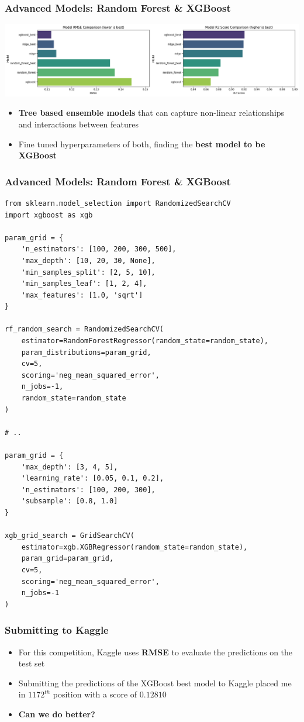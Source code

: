 \documentclass{beamer}
\begin{document}
\begin{frame}
\frametitle{Advanced Models: Random Forest \& XGBoost}
\centering
    \includegraphics[width=1\textwidth]{../challenge/main_files/main_73_0.png}

\begin{itemize}
    \item \textbf{Tree based ensemble models} that can capture non-linear relationships and interactions between features
    \item Fine tuned hyperparameters of both, finding the \textbf{best model to be XGBoost}
\end{itemize}
\end{frame}

\begin{frame}[fragile]
\frametitle{Advanced Models: Random Forest \& XGBoost}

\begin{verbatim}
from sklearn.model_selection import RandomizedSearchCV
import xgboost as xgb

param_grid = {
    'n_estimators': [100, 200, 300, 500],
    'max_depth': [10, 20, 30, None],
    'min_samples_split': [2, 5, 10],
    'min_samples_leaf': [1, 2, 4],
    'max_features': [1.0, 'sqrt']
}

rf_random_search = RandomizedSearchCV(
    estimator=RandomForestRegressor(random_state=random_state),
    param_distributions=param_grid,
    cv=5,
    scoring='neg_mean_squared_error',
    n_jobs=-1,
    random_state=random_state
)

# ..

param_grid = {
    'max_depth': [3, 4, 5],
    'learning_rate': [0.05, 0.1, 0.2],
    'n_estimators': [100, 200, 300],
    'subsample': [0.8, 1.0]
}

xgb_grid_search = GridSearchCV(
    estimator=xgb.XGBRegressor(random_state=random_state),
    param_grid=param_grid,
    cv=5,
    scoring='neg_mean_squared_error',
    n_jobs=-1
)
\end{verbatim}
\end{frame}

\begin{frame}
\frametitle{Submitting to Kaggle}

\begin{itemize}
    \item For this competition, Kaggle uses \textbf{RMSE} to evaluate the predictions on the test set
    \item Submitting the predictions of the XGBoost best model to Kaggle placed me in \textbf{$1172^{th}$} position with a score of \textbf{$0.12810$}
    \item \textbf{Can we do better?}
\end{itemize}
\end{frame}
\end{document}
